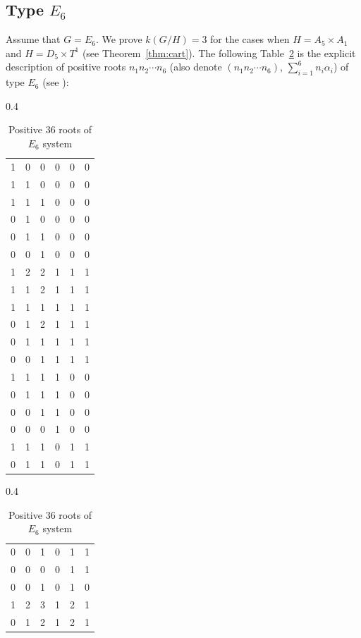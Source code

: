 \documentclass{amsart}
\theoremstyle{definition}
\theoremstyle{remark}
\numberwithin{equation}{section}
\begin{document}
\subsection{Type $E_{6}$}
\label{sect:9.1}
Assume that $G=E_{6}$. 
We prove $k(G/H)=3$ for the cases when $H=A_{5}\times A_{1}$ and $H=D_{5}\times T^{1}$ (see Theorem~\ref{thm:cart}).
The following Table~\ref{fig:e6} is the explicit description of positive roots $n_{1}n_{2}\cdots n_{6}$ (also denote $(n_{1}n_{2}\cdots n_{6})$, $\sum_{i=1}^{6} n_{i}\alpha_{i}$) of type $E_{6}$ (see \cite[93--94]{Y25}):
\begin{table}[H]
\centering
\caption{Positive $36$ roots of $E_{6}$ system}\label{fig:e6}
\begin{subtable}{0.4\textwidth}
\centering
\begin{tabular}{llllll}
1 & 0 & 0 & 0 & 0 & 0 \\
1 & 1 & 0 & 0 & 0 & 0 \\
1 & 1 & 1 & 0 & 0 & 0 \\
0 & 1 & 0 & 0 & 0 & 0 \\
0 & 1 & 1 & 0 & 0 & 0 \\
0 & 0 & 1 & 0 & 0 & 0 \\
1 & 2 & 2 & 1 & 1 & 1 \\
1 & 1 & 2 & 1 & 1 & 1 \\
1 & 1 & 1 & 1 & 1 & 1 \\
0 & 1 & 2 & 1 & 1 & 1 \\
0 & 1 & 1 & 1 & 1 & 1 \\
0 & 0 & 1 & 1 & 1 & 1 \\
1 & 1 & 1 & 1 & 0 & 0 \\
0 & 1 & 1 & 1 & 0 & 0 \\
0 & 0 & 1 & 1 & 0 & 0 \\
0 & 0 & 0 & 1 & 0 & 0 \\
1 & 1 & 1 & 0 & 1 & 1 \\
0 & 1 & 1 & 0 & 1 & 1 \\
\end{tabular}
\end{subtable}
\centering
\begin{subtable}{0.4\textwidth}
\centering
\begin{tabular}{llllll}
0 & 0 & 1 & 0 & 1 & 1 \\
0 & 0 & 0 & 0 & 1 & 1 \\
0 & 0 & 1 & 0 & 1 & 0 \\
1 & 2 & 3 & 1 & 2 & 1 \\
0 & 1 & 2 & 1 & 2 & 1 \\

\end{tabular}
\end{subtable}
\end{table}
\end{document}
